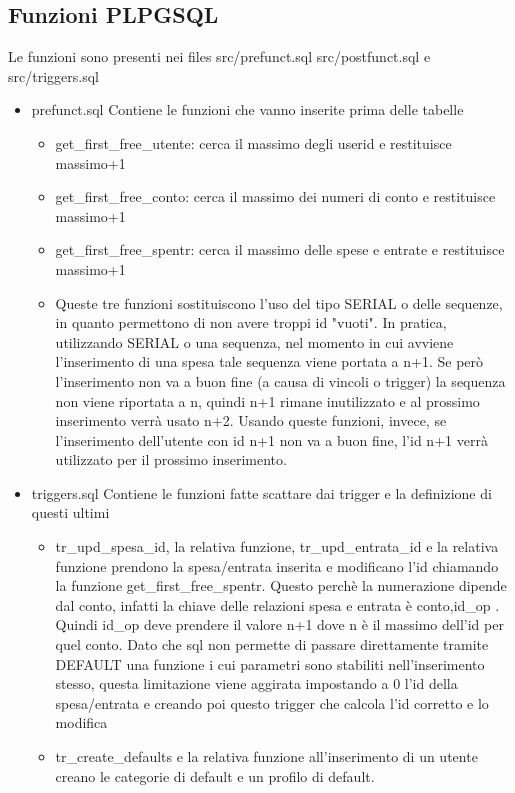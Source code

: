 \documentclass[a4paper,10pt]{article}
\begin{document}
\subsection{Funzioni PLPGSQL}
Le funzioni sono presenti nei files src/prefunct.sql src/postfunct.sql e src/triggers.sql
\begin{itemize}
\item prefunct.sql Contiene le funzioni che vanno inserite prima delle tabelle
\begin{itemize}
\item get\_{}first\_{}free\_{}utente: cerca il massimo degli userid e restituisce massimo+1
\item get\_{}first\_{}free\_{}conto: cerca il massimo dei numeri di conto e restituisce massimo+1
\item get\_{}first\_{}free\_{}spentr: cerca il massimo delle spese e entrate e restituisce massimo+1
\item Queste tre funzioni sostituiscono l'uso del tipo SERIAL o delle sequenze, in quanto permettono di non avere troppi id "vuoti". In pratica, utilizzando SERIAL o una sequenza, nel momento in cui avviene l'inserimento di una spesa tale sequenza viene portata a n+1. Se però l'inserimento non va a buon fine (a causa di vincoli o trigger) la sequenza non viene riportata a n, quindi n+1 rimane inutilizzato e al prossimo inserimento verrà usato n+2. Usando queste funzioni, invece, se l'inserimento dell'utente con id n+1 non va a buon fine, l'id n+1 verrà utilizzato per il prossimo inserimento.
\end{itemize}
\item triggers.sql Contiene le funzioni fatte scattare dai trigger e la definizione di questi ultimi
\begin{itemize}
\item tr\_{}upd\_{}spesa\_{}id, la relativa funzione, tr\_{}upd\_{}entrata\_{}id e la relativa funzione prendono la spesa/entrata inserita e modificano l'id chiamando la funzione get\_{}first\_{}free\_{}spentr. Questo perchè la numerazione dipende dal conto, infatti la chiave delle relazioni spesa e entrata è conto,id\_{}op . Quindi id\_{}op deve prendere il valore n+1 dove n è il massimo dell'id per quel conto. Dato che sql non permette di passare direttamente tramite DEFAULT una funzione i cui parametri sono stabiliti nell'inserimento stesso, questa limitazione viene aggirata impostando a 0 l'id della spesa/entrata e creando poi questo trigger che calcola l'id corretto e lo modifica
\item tr\_{}create\_{}defaults e la relativa funzione all'inserimento di un utente creano le categorie di default e un profilo di default.

\end{itemize}
\end{itemize}
\end{document}
